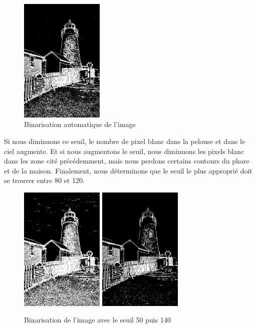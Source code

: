 \documentclass[a4paper,11pt]{article}
\begin{document}
  \begin{figure}[H]
  \center
   \includegraphics[width=4cm]{../binAuto.png}
   \caption{Binarisation automatique de l'image}
  \end{figure}
  
  Si nous diminuons ce seuil, le nombre de pixel blanc dans la pelouse et dans le ciel augmente. Et si
  nous augmentons le seuil, nous diminuons les pixels blanc dans les zone cité précédemment, mais nous
  perdons certains contours du phare et de la maison. Finalement, nous déterminons que le seuil le plus 
  approprié doit se trouver entre 80 et 120.\\
  
  \begin{figure}[H]
  \center
   \includegraphics[width=4cm]{../bin50.png}
   \includegraphics[width=4cm]{../bin140.png}
   \caption{Binarisation de l'image avec le seuil 50 puis 140}
  \end{figure}
  
\end{document}

